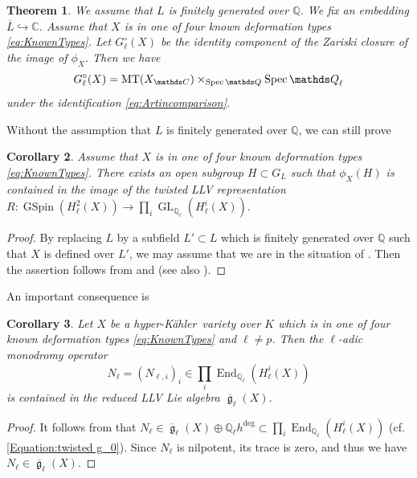 \documentclass[12pt,reqno]{amsart}
\newtheorem{thm}{Theorem}[section]
\newtheorem{cor}[thm]{Corollary}
\theoremstyle{definition}
\newcommand{\Q}{{\mathds Q}}
\newcommand{\C}{{\mathds C}}
\newcommand\End{\mathop{\mathrm{End}}\nolimits}
\newcommand\GL{\mathop{\mathrm{GL}}\nolimits}
\renewcommand\ge{\mathop{\mathfrak{g}}\nolimits}
\newcommand\GSpin{\mathop{\mathrm{GSpin}}\nolimits}
\newcommand\Spec{\mathop{\rm Spec}}
\newcommand{\hk}{hyper-Kähler~}
\DeclareMathOperator{\MT}{MT}
\numberwithin{equation}{section}
\begin{document}
\begin{thm}\label{Theorem:Mumford-Tate conjecture}
We assume that $L$ is finitely generated over $\Q$.
We fix an embedding $\overline{L} \hookrightarrow \C$.
Assume that $X$ is in one of four known deformation types \eqref{eq:KnownTypes}.
Let
$G^\circ_\ell(X)$ be the identity component of the Zariski closure of the image of $\phi_X$.
Then we have
\[
G^\circ_\ell(X) = \MT(X_\C) \times_{\Spec \Q} \Spec \Q_\ell
\]
under the identification \eqref{eq:Artincomparison}.
\end{thm}


Without the assumption that $L$ is finitely generated over $\Q$, we can still prove

\begin{cor}\label{Corollary:Galois in LLV for known types}
Assume that $X$ is in one of four known deformation types \eqref{eq:KnownTypes}.
There exists an open subgroup $H \subset G_L$
such that $\phi_X(H)$ is contained in
the image of the twisted LLV representation
$
R \colon \GSpin(H^2_\ell(X)) \to \prod_i\GL_{\Q_\ell}(H^i_\ell(X)).
$
\end{cor}

\begin{proof}
    By replacing $L$ by a subfield $L' \subset L$ which is finitely generated over $\Q$ such that $X$ is defined over $L'$, we may assume that we are in the situation of .
    Then the assertion follows from  and
     (see also ).
\end{proof}

An important consequence is

\begin{cor}\label{Corollary:ell-adic monodromy operators in LLV for known types}
Let $X$ be a \hk variety over $K$ which is in one of four known deformation types \eqref{eq:KnownTypes}
and $\ell \neq p$.
    Then the $\ell$-adic monodromy operator
    \[
    N_\ell = (N_{\ell, i})_i \in \prod_i \End_{\Q_\ell}(H^i_{\ell}(X))
    \]
    is contained in the reduced LLV Lie algebra $\overline{\ge}_{\ell}(X)$.
\end{cor}

\begin{proof}
    It follows from  that
    $N_\ell \in \overline{\ge}_\ell(X) \oplus \Q_\ell h^{\deg} \subset \prod_i\End_{\Q_\ell}(H^i_\ell(X))$
    (cf.~ \eqref{Equation:twisted g_0}).
    Since $N_\ell$ is nilpotent, its trace is zero, and thus we have $N_\ell \in \overline{\ge}_\ell(X)$.
\end{proof}
\end{document}
